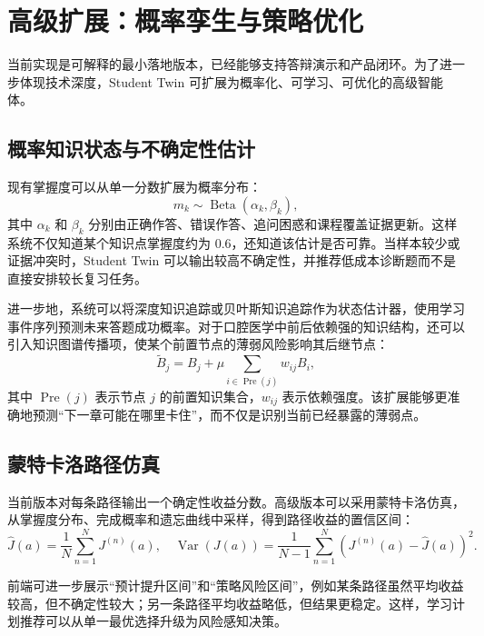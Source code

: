 \section{高级扩展：概率孪生与策略优化}

当前实现是可解释的最小落地版本，已经能够支持答辩演示和产品闭环。为了进一步体现技术深度，Student Twin 可扩展为概率化、可学习、可优化的高级智能体。

\subsection{概率知识状态与不确定性估计}

现有掌握度可以从单一分数扩展为概率分布：
\begin{equation}
  m_k\sim \operatorname{Beta}(\alpha_k,\beta_k),
  \label{eq:student-twin-beta-mastery}
\end{equation}
其中 $\alpha_k$ 和 $\beta_k$ 分别由正确作答、错误作答、追问困惑和课程覆盖证据更新。这样系统不仅知道某个知识点掌握度约为 $0.6$，还知道该估计是否可靠。当样本较少或证据冲突时，Student Twin 可以输出较高不确定性，并推荐低成本诊断题而不是直接安排较长复习任务。

进一步地，系统可以将深度知识追踪或贝叶斯知识追踪作为状态估计器，使用学习事件序列预测未来答题成功概率。对于口腔医学中前后依赖强的知识结构，还可以引入知识图谱传播项，使某个前置节点的薄弱风险影响其后继节点：
\begin{equation}
  \tilde B_j =
  B_j+
  \mu
  \sum_{i\in \operatorname{Pre}(j)}
  w_{ij}B_i,
  \label{eq:student-twin-graph-risk}
\end{equation}
其中 $\operatorname{Pre}(j)$ 表示节点 $j$ 的前置知识集合，$w_{ij}$ 表示依赖强度。该扩展能够更准确地预测“下一章可能在哪里卡住”，而不仅是识别当前已经暴露的薄弱点。

\subsection{蒙特卡洛路径仿真}

当前版本对每条路径输出一个确定性收益分数。高级版本可以采用蒙特卡洛仿真，从掌握度分布、完成概率和遗忘曲线中采样，得到路径收益的置信区间：
\begin{equation}
  \hat J(a)=
  \frac{1}{N}
  \sum_{n=1}^{N}
  J^{(n)}(a),
  \quad
  \operatorname{Var}(J(a))=
  \frac{1}{N-1}
  \sum_{n=1}^{N}
  \left(J^{(n)}(a)-\hat J(a)\right)^2.
  \label{eq:student-twin-monte-carlo}
\end{equation}

前端可进一步展示“预计提升区间”和“策略风险区间”，例如某条路径虽然平均收益较高，但不确定性较大；另一条路径平均收益略低，但结果更稳定。这样，学习计划推荐可以从单一最优选择升级为风险感知决策。

